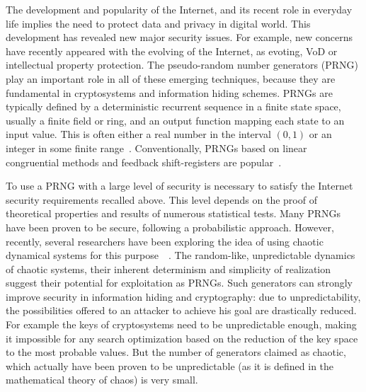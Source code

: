 \documentclass[10pt, a4paper, conference, compsocconf]{IEEEtran}
\begin{document}
The development and popularity of the Internet, and its recent role in everyday life implies the need to protect data and privacy in digital world. This development has revealed new major security issues. For example, new concerns have recently appeared with the evolving of the Internet, as evoting, VoD or intellectual property protection. The pseudo-random number generators (PRNG) play an important role in all of these emerging techniques, because they are fundamental in cryptosystems and information hiding schemes. 
PRNGs are typically defined by a deterministic recurrent sequence in a finite state space, usually a finite field or ring, and an output function mapping each state to an input value. This is often either a real number in the interval $(0,1)$ or an integer in some finite range~\cite{L'ecuyer2008}. Conventionally, PRNGs based on linear congruential methods and feedback shift-registers are popular~\cite{Knuth1998}.

To use a PRNG with a large level of security is necessary to satisfy the Internet security requirements recalled above.
This level depends on the proof of theoretical properties and results of numerous statistical tests. 
Many PRNGs have been proven to be secure, following a probabilistic approach. 
However, recently, several researchers have been exploring the idea of using chaotic dynamical systems for this purpose~\cite{Falcioni2005}~\cite{Cecen2009}. 
The random-like, unpredictable dynamics of chaotic systems, their inherent determinism and simplicity of realization suggest their potential for exploitation as PRNGs.
Such generators can strongly improve security in information hiding and cryptography: due to unpredictability, the possibilities offered to an attacker to achieve his goal are drastically reduced. 
For example the keys of cryptosystems need to be unpredictable enough, making it impossible for any search optimization based on the reduction of the key space to the most probable values. 
But the number of generators claimed as chaotic, which actually have been proven to be unpredictable (as it is defined in the mathematical theory of chaos) is very small.
 
\end{document}
